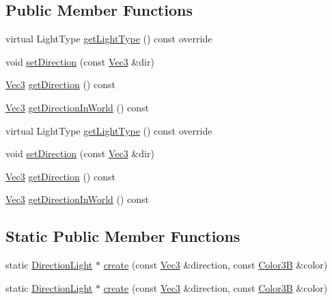 \subsection*{Public Member Functions}
\begin{DoxyCompactItemize}
\item 
virtual Light\+Type \hyperlink{classDirectionLight_a43c8fb8a7450d086430e0e2790a6a619}{get\+Light\+Type} () const override
\item 
void \hyperlink{classDirectionLight_a2a14a017012b2d1b76a25852f7c16e0a}{set\+Direction} (const \hyperlink{classVec3}{Vec3} \&dir)
\item 
\hyperlink{classVec3}{Vec3} \hyperlink{classDirectionLight_ab083f506640a52cfa4d2484496041e38}{get\+Direction} () const
\item 
\hyperlink{classVec3}{Vec3} \hyperlink{classDirectionLight_a07379e5562bdcaffc822297d79588ac1}{get\+Direction\+In\+World} () const
\item 
virtual Light\+Type \hyperlink{classDirectionLight_a43c8fb8a7450d086430e0e2790a6a619}{get\+Light\+Type} () const override
\item 
void \hyperlink{classDirectionLight_a2a14a017012b2d1b76a25852f7c16e0a}{set\+Direction} (const \hyperlink{classVec3}{Vec3} \&dir)
\item 
\hyperlink{classVec3}{Vec3} \hyperlink{classDirectionLight_ab083f506640a52cfa4d2484496041e38}{get\+Direction} () const
\item 
\hyperlink{classVec3}{Vec3} \hyperlink{classDirectionLight_a07379e5562bdcaffc822297d79588ac1}{get\+Direction\+In\+World} () const
\end{DoxyCompactItemize}
\subsection*{Static Public Member Functions}
\begin{DoxyCompactItemize}
\item 
static \hyperlink{classDirectionLight}{Direction\+Light} $\ast$ \hyperlink{classDirectionLight_a6d3a57b3058009beaaa2b454e3c32a06}{create} (const \hyperlink{classVec3}{Vec3} \&direction, const \hyperlink{structColor3B}{Color3B} \&color)
\item 
static \hyperlink{classDirectionLight}{Direction\+Light} $\ast$ \hyperlink{classDirectionLight_a8a5ea047ba6cb79f57acdeb76b1d5725}{create} (const \hyperlink{classVec3}{Vec3} \&direction, const \hyperlink{structColor3B}{Color3B} \&color)
\end{DoxyCompactItemize}
